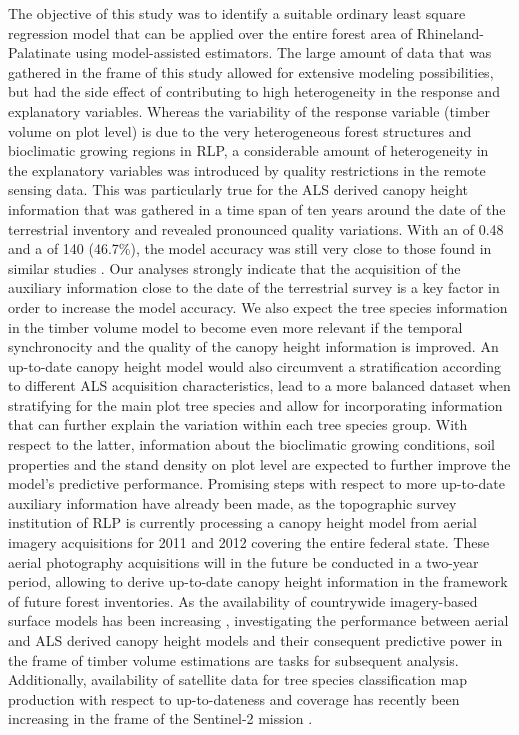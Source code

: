 The objective of this study was to identify a suitable ordinary least square regression model that can be applied over the entire forest area of Rhineland-Palatinate using model-assisted estimators. The large amount of data that was gathered in the frame of this study allowed for extensive modeling possibilities, but had the side effect of contributing to high heterogeneity in the response and explanatory variables. Whereas the variability of the response variable (timber volume on plot level) is due to the very heterogeneous forest structures and bioclimatic growing regions in RLP, a considerable amount of heterogeneity in the explanatory variables was introduced by quality restrictions in the remote sensing data. This was particularly true for the ALS derived canopy height information that was gathered in a time span of ten years around the date of the terrestrial inventory and revealed pronounced quality variations. With an \adjrsq{} of 0.48 and a \rmsecv{} of 140 \mha{} (46.7\%), the model accuracy was still very close to those found in similar studies \citep{maack2016}. Our analyses strongly indicate that the acquisition of the auxiliary information close to the date of the terrestrial survey is a key factor in order to increase the model accuracy. We also expect the tree species information in the timber volume model to become even more relevant if the temporal synchronocity and the quality of the canopy height information is improved. An up-to-date canopy height model would also circumvent a stratification according to different ALS acquisition characteristics, lead to a more balanced dataset when stratifying for the main plot tree species and allow for incorporating information that can further explain the variation within each tree species group. With respect to the latter, information about the bioclimatic growing conditions, soil properties and the stand density on plot level are expected to further improve the model's predictive performance. Promising steps with respect to more up-to-date auxiliary information have already been made, as the topographic survey institution of RLP is currently processing a canopy height model from aerial imagery acquisitions for 2011 and 2012 covering the entire federal state. These aerial photography acquisitions will in the future be conducted in a two-year period, allowing to derive up-to-date canopy height information in the framework of future forest inventories. As the availability of countrywide imagery-based surface models has been increasing \citep{ginzler2015}, investigating the performance between aerial and ALS derived canopy height models and their consequent predictive power in the frame of timber volume estimations \citep{ullah2017} are tasks for subsequent analysis. Additionally, availability of satellite data for tree species classification map production with respect to up-to-dateness and coverage has recently been increasing in the frame of the Sentinel-2 mission \citep{sentinel2}.